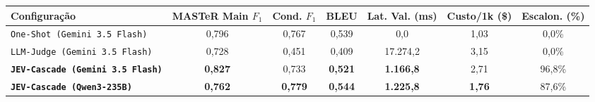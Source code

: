 \begin{tabular}{lcccccc}
\toprule
Configuração & MASTeR Main $F_1$ & Cond. $F_1$ & BLEU & Lat. Val. (ms) & Custo/1k (\$) & Escalon. (\%) \\
\midrule
\texttt{One-Shot (Gemini 3.5 Flash)} & 0,796 & 0,767 & 0,539 & 0,0 & 1,03 & 0,0\% \\
\texttt{LLM-Judge (Gemini 3.5 Flash)} & 0,728 & 0,451 & 0,409 & 17.274,2 & 3,15 & 0,0\% \\
\textbf{\texttt{JEV-Cascade (Gemini 3.5 Flash)}} & \textbf{0,827} & 0,733 & \textbf{0,521} & \textbf{1.166,8} & 2,71 & 96,8\% \\
\textbf{\texttt{JEV-Cascade (Qwen3-235B)}} & \textbf{0,762} & \textbf{0,779} & \textbf{0,544} & \textbf{1.225,8} & \textbf{1,76} & 87,6\% \\
\bottomrule
\end{tabular}
